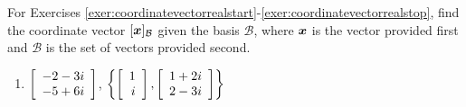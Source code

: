 
\noindent For Exercises \ref{exer:coordinatevectorrealstart}-\ref{exer:coordinatevectorrealstop}, find the coordinate vector $[\boldsymbol x]_{\mathcal{B}}$ given the basis $\mathcal{B}$, where $\boldsymbol x$ is the vector provided first and $\mathcal{B}$ is the set of vectors provided second. 
\begin{enumerate}[!HW!, start=1, label=$\spadesuit$ \arabic*., ref=\arabic*]
\item\label{exer:coordinatevectorrealstop} $ \left[\begin{array}{r} -2-3i\\-5+6i \end{array}\right]$, $\left\{\left[\begin{array}{r} 1\\i \end{array}\right], \left[\begin{array}{r} 1+2i\\2-3i \end{array}\right]\right\}$
\end{enumerate}

